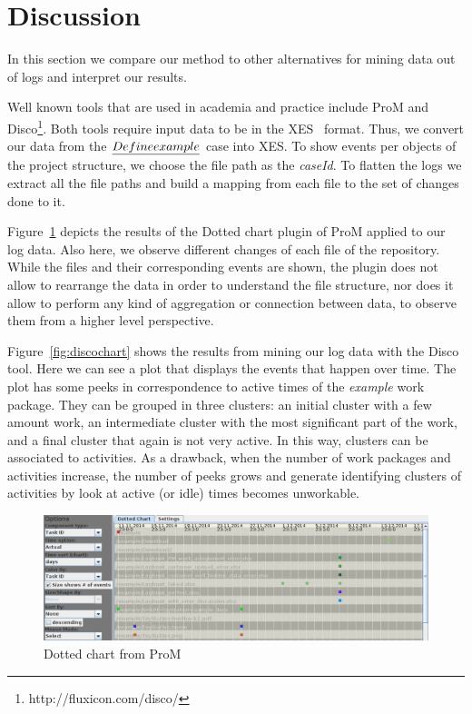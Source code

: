 \section{Discussion}\label{sec:discuss}

In this section we compare our method to other alternatives for mining data out of logs and interpret our results.

Well known tools that are used in academia and practice include ProM\cite{van2005prom} and Disco\footnote{http://fluxicon.com/disco/}. Both tools require input data to be in the XES~\cite{verbeek2011xes} format. Thus, we convert our data from the $\emph{Define example}$ case into XES. To show events per objects of the project structure, we choose the file path as the \emph{caseId}. To flatten the logs we extract all the file paths and build a mapping from each file to the set of changes done to it.

Figure~\ref{fig:dottedchart} depicts the results of the Dotted chart plugin of ProM applied to our log data. Also here, we observe different changes of each file of the repository. While the files and their corresponding events are shown, the plugin does not allow to rearrange the data in order to understand the file structure, nor does it allow to perform any kind of aggregation or connection between data, to observe them from a higher level perspective.

Figure~\ref{fig:discochart} shows the results from mining our log data with the Disco tool. Here we can see a plot that displays the events that happen over time. The plot has some peeks in correspondence to active times of the \emph{example} work package. They can be grouped in three clusters: an initial cluster with a few amount work, an intermediate cluster with the most significant part of the work, and a final cluster that again is not very active. In this way, clusters can be associated to activities. As a drawback, when the number of work packages and activities increase, the number of peeks grows and generate identifying clusters of activities by look at active (or idle) times becomes unworkable.

\begin{figure}
\centering
\includegraphics[width=\textwidth]{bpm2015/imgs/dotted_chart_ordered_by_taskID_cut}
\caption{Dotted chart from ProM}
\label{fig:dottedchart}
\end{figure}



